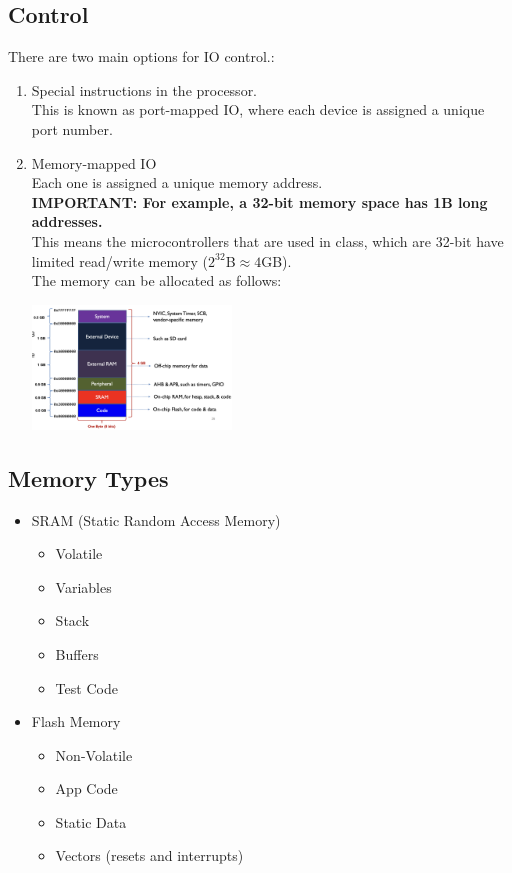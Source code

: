 \documentclass[nobib]{tufte-handout}
\begin{document}
\subsection{Control}
There are two main options for IO control.:
\begin{enumerate}
    \item Special instructions in the processor.\\
    This is known as port-mapped IO, where each device is assigned a unique port number.
    \item Memory-mapped IO\\
    Each one is assigned a unique memory address.\\
    \textbf{IMPORTANT: For example, a 32-bit memory space has 1B long addresses.}\\
    This means the microcontrollers that are used in class, which are 32-bit have limited read/write memory ($2^{32}$B$\approx 4$GB).\\
    The memory can be allocated as follows:\\
    \begin{center}
        \includegraphics[width=200px]{images/memory_allocation.png}
    \end{center}
\end{enumerate}
\subsection{Memory Types}
\begin{itemize}
    \item SRAM (Static Random Access Memory)
    \begin{itemize}
        \item Volatile
        \item Variables
        \item Stack 
        \item Buffers
        \item Test Code
    \end{itemize}
    \item Flash Memory 
    \begin{itemize}
        \item Non-Volatile
        \item App Code
        \item Static Data 
        \item Vectors (resets and interrupts)
    \end{itemize}
\end{itemize}
\end{document}
